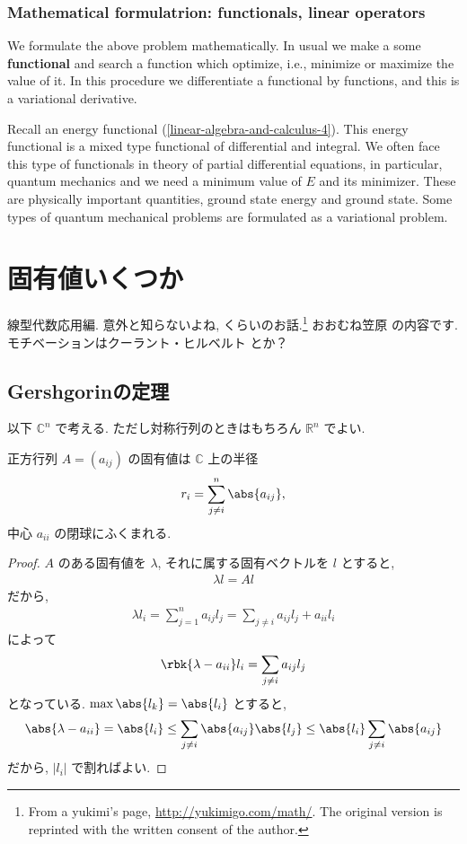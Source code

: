 \documentclass[openany, a4paper, oneside]{jsbook}
\begin{document}
\subsection{Mathematical formulatrion: functionals, linear operators}

We formulate the above problem mathematically.
In usual we make a some \textbf{functional} and search a function
which optimize, i.e., minimize or maximize the value of it.
In this procedure we differentiate a functional by functions,
and this is a variational derivative.

Recall an energy functional (\ref{linear-algebra-and-calculus-4}).
This energy functional is a mixed type functional of differential and integral.
We often face this type of functionals in theory of partial differential equations,
in particular, quantum mechanics and we need a minimum value of $E$ and its minimizer.
These are physically important quantities, ground state energy and ground state.
Some types of quantum mechanical problems are formulated as a variational problem.
\chapter{固有値いくつか}

線型代数応用編. 意外と知らないよね, くらいのお話.\footnote{From a yukimi's page, \url{http://yukimigo.com/math/}.
The original version is reprinted with the written consent of the author.}
おおむね笠原 \cite{KoujiKasahara1}の内容です.
モチベーションはクーラント・ヒルベルト \cite{CourantHilbert1}とか？
\section{Gershgorinの定理}

以下 $\mathbb{C}^n$ で考える. ただし対称行列のときはもちろん $\mathbb{R}^n$  でよい.
\begin{thm}[Gershgorinの定理]
 正方行列 $A = (a_{ij})$ の固有値は $\mathbb{C}$ 上の半径
  \begin{align}
   r_i
   =
   \sum_{j\neq i}^n \abs{a_{ij}},
  \end{align}
 中心 $a_{ii}$ の閉球にふくまれる.
\end{thm}

\begin{proof}
$A$ のある固有値を $\lambda$, それに属する固有ベクトルを
$l$ とすると,
\begin{align}
 \lambda l
 =
 Al
\end{align}
だから,
\begin{align}
 \lambda l_i
 =
 \sum_{j=1}^n
 a_{ij} l_j
 =
 \sum_{j \neq i} a_{ij} l_j  + a_{ii} l_i
\end{align}
によって
\begin{align}
 \rbk{\lambda - a_{ii}} l_i
 =
 \sum_{j \neq i} a_{ij} l_j
\end{align}
となっている.
$\max \abs{l_k} = \abs{l_i}$ とすると,
\begin{align}
 \abs{\lambda - a_{ii}}
 =
 \abs{l_i}
 \le
 \sum_{j \neq i} \abs{a_{ij}} \abs{l_j}
 \le
 \abs{l_i} \sum_{j \neq i} \abs{a_{ij}}
\end{align}
だから, $|l_i|$ で割ればよい.
\end{proof}
\end{document}
